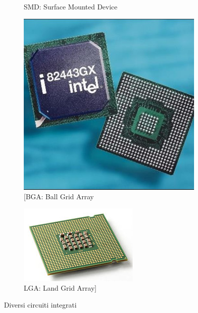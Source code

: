 \documentclass[
]{book}
\begin{document}
\begin{figure}[h]
\begin{subfigure}[b]{0.2\textwidth}
    \caption{SMD: Surface Mounted Device}
  \end{subfigure}
  \begin{subfigure}[b]{0.2\textwidth}
    \includegraphics[width=\textwidth]{immagini/32.jpg}
    \caption{[BGA: Ball Grid Array}
  \end{subfigure}
  \hspace{0.02\textwidth}
  \begin{subfigure}[b]{0.2\textwidth}
    \includegraphics[width=\textwidth]{immagini/33.jpg}
    \caption{LGA: Land Grid Array]}
\end{subfigure}
\caption{Diversi circuiti integrati}
\end{figure}
\end{document}
